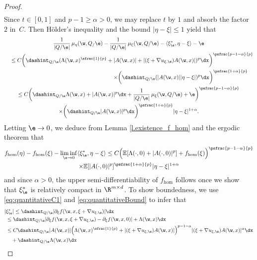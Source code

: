 \begin{proof}
\begin{multline*}
\end{multline*}
Since $t\in [0,1]$ and $p-1\geq\alpha>0$, we may replace $t$ by $1$ and absorb the factor~$2$ in~$C$. Then Hölder's inequality and the bound $|\eta-\xi|\leq 1$ yield that\vspace*{-5pt}
\begin{multline*}
\frac{1}{|Q/\e|}\,\mu_{\eta}(\w,Q_/\e)-\frac{1}{|Q/\e|}\,\mu_{\xi}(\w,Q/\e)-\langle\xi_{\e}^*,\eta-\xi\rangle-\e
\\
\hspace*{4.5mm}\leq C\biggl(\dashint_{Q/\e}(\Lambda(\w,x)^{\sfrac{1}{p}}+|A(\w,x)|+|(\xi+\nabla u_{\xi,\e})A(\w,x)|)^{p}\dx\biggr)^{\psfrac{p-1-\alpha}{p}}
\\
\shoveright{\times \biggl(\dashint_{Q/\e}(|A(\w,x)||\eta-\xi|)^p\dx\biggr)^{\psfrac{1+\alpha}{p}}}
\\
\leq C\biggl(\dashint_{Q/\e}\Lambda(\w,x)+|A(\w,x)|^p\dx+\frac{1}{|Q/\e|}\,\mu_{\xi}(\w,Q/\e)+\e\biggr)^{\psfrac{p-1-\alpha}{p}}
\\
\times\biggl(\dashint_{Q/\e}|A(\w,x)|^p\dx\biggr)^{\psfrac{1+\alpha}{p}}|\eta-\xi|^{1+\alpha}.
\end{multline*}
Letting $\e\to 0$, we deduce from Lemma \ref{l.existence_f_hom} and the ergodic theorem that\vspace*{-5pt}
\begin{multline*}
f_{\hom}(\eta)-f_{\hom}(\xi)-\liminf_{\e\to 0}\langle\xi_{\e}^*,\eta-\xi\rangle\leq C\Big(\mathbb{E}[\Lambda(\cdot,0)+|A(\cdot,0)|^p]+f_{\hom}(\xi)\Big)^{\psfrac{p-1-\alpha}{p}}
\\
\times\mathbb{E}[|A(\cdot,0)|^p]^{\psfrac{1+\alpha}{p}}|\eta-\xi|^{1+\alpha}
\end{multline*}
and since $\alpha>0$, the upper semi-differentiability of $f_{\hom}$ follows once we show that $\xi_{\e}^*$ is relatively compact in $\R^{m\times d}$. To show boundedness, we use \eqref{eq:quantitativeC1} and \eqref{eq:quantitativeBound} to infer that\vspace*{-5pt}
\begin{align*}
|&\xi_{\e}^*|\leq\dashint_{Q/\e}|\partial_{\xi}f(\w,x,\xi+\nabla u_{\xi,\e})|\dx
\\
&\leq \dashint_{Q/\e}|\partial_{\xi}f(\w,x,\xi+\nabla u_{\xi,\e})-\partial_{\xi}f(\w,x,0)|+\Lambda(\w,x)\dx
\\
&\leq C\dashint_{Q/\e}|A(\w,x)|\Big(\Lambda(\w,x)^{\sfrac{1}{p}}+|(\xi+\nabla u_{\xi,\e})A(\w,x)|\Big)^{p-1-\alpha}|(\xi+\nabla u_{\xi,\e})A(\w,x)|^{\alpha}\dx
\\
&\quad+\dashint_{Q/\e}\Lambda(\w,x)\dx

\end{align*}
\end{proof}
